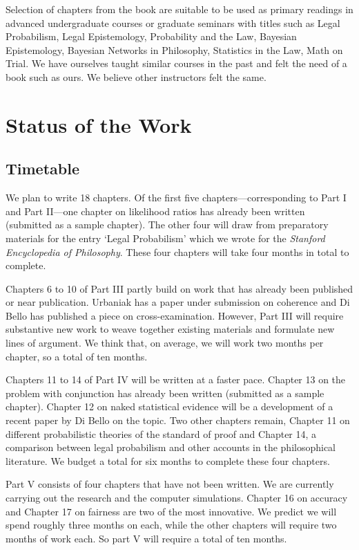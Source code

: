 \documentclass[
  10pt,
  dvipsnames,enabledeprecatedfontcommands]{scrartcl}
\begin{document}
Selection of chapters from the book are suitable to be used as primary
readings in advanced undergraduate courses or graduate seminars with
titles such as Legal Probabilism, Legal Epistemology, Probability and
the Law, Bayesian Epistemology, Bayesian Networks in Philosophy,
Statistics in the Law, Math on Trial. We have ourselves taught similar
courses in the past and felt the need of a book such as ours. We believe
other instructors felt the same.

\hypertarget{status-of-the-work}{%
\section{Status of the Work}\label{status-of-the-work}}

\hypertarget{timetable}{%
\subsection{Timetable}\label{timetable}}

We plan to write 18 chapters. Of the first five chapters---corresponding
to Part I and Part II---one chapter on likelihood ratios has already
been written (submitted as a sample chapter). The other four will draw
from preparatory materials for the entry `Legal Probabilism' which we
wrote for the \textit{Stanford Encyclopedia of Philosophy}. These four
chapters will take four months in total to complete.

Chapters 6 to 10 of Part III partly build on work that has already been
published or near publication. Urbaniak has a paper under submission on
coherence and Di Bello has published a piece on cross-examination.
However, Part III will require substantive new work to weave together
existing materials and formulate new lines of argument. We think that,
on average, we will work two months per chapter, so a total of ten
months.

Chapters 11 to 14 of Part IV will be written at a faster pace. Chapter
13 on the problem with conjunction has already been written (submitted
as a sample chapter). Chapter 12 on naked statistical evidence will be a
development of a recent paper by Di Bello on the topic. Two other
chapters remain, Chapter 11 on different probabilistic theories of the
standard of proof and Chapter 14, a comparison between legal probabilism
and other accounts in the philosophical literature. We budget a total
for six months to complete these four chapters.

Part V consists of four chapters that have not been written. We are
currently carrying out the research and the computer simulations.
Chapter 16 on accuracy and Chapter 17 on fairness are two of the most
innovative. We predict we will spend roughly three months on each, while
the other chapters will require two months of work each. So part V will
require a total of ten months.
\end{document}
